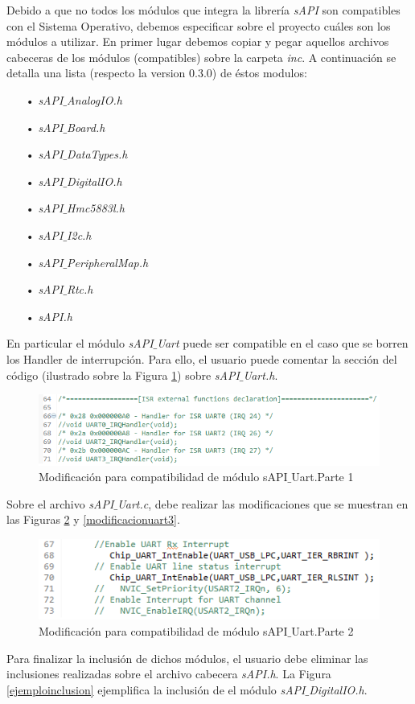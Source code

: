\documentclass[12pt,letterpaper]{article}
\begin{document}
Debido a que no todos los módulos que integra la librería \textit{sAPI} son compatibles con el Sistema Operativo, debemos especificar sobre el proyecto cuáles son los módulos a utilizar. En primer lugar debemos copiar y pegar aquellos archivos cabeceras de los módulos (compatibles) sobre la carpeta \textit{inc}. A continuación se detalla una lista (respecto la version 0.3.0) de éstos modulos:
\begin{enumerate}
\item[•]\textit{sAPI$\_$AnalogIO.h}
\item[•]\textit{sAPI$\_$Board.h}
\item[•]\textit{sAPI$\_$DataTypes.h}
\item[•]\textit{sAPI$\_$DigitalIO.h}
\item[•]\textit{sAPI$\_$Hmc5883l.h}
\item[•]\textit{sAPI$\_$I2c.h}
\item[•]\textit{sAPI$\_$PeripheralMap.h}
\item[•]\textit{sAPI$\_$Rtc.h}
\item[•]\textit{sAPI.h}
\end{enumerate}
En particular el módulo \textit{sAPI$\_$Uart} puede ser compatible en el caso que se borren los Handler de interrupción. Para ello, el usuario puede comentar la sección del código (ilustrado sobre la Figura \ref{modificacionuart}) sobre \textit{sAPI$\_$Uart.h}.

\begin{figure}[!h]
\centering
\includegraphics[width=8 cm]{figuras/f29.png}
\caption{Modificación para compatibilidad de módulo sAPI$\_$Uart.Parte 1}
\label{modificacionuart}
\end{figure}

Sobre el archivo \textit{sAPI$\_$Uart.c}, debe realizar las modificaciones que se muestran en las Figuras \ref{modificacionuart2} y \ref{modificacionuart3}.
\begin{figure}[!h]
\centering
\includegraphics[width=8 cm]{figuras/f30.png}
\caption{Modificación para compatibilidad de módulo sAPI$\_$Uart.Parte 2}
\label{modificacionuart2}
\end{figure}
Para finalizar la inclusión de dichos módulos, el usuario debe eliminar las inclusiones realizadas sobre el archivo cabecera \textit{sAPI.h}. La Figura \ref{ejemploinclusion} ejemplifica la inclusión de el módulo \textit{sAPI$\_$DigitalIO.h}.
\end{document}
